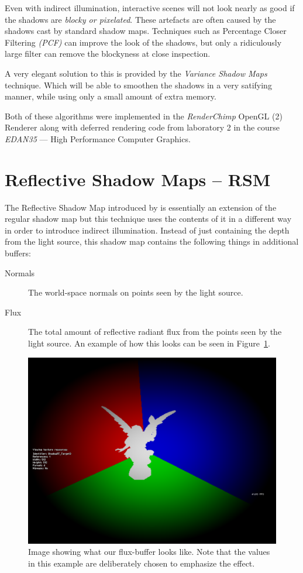 \documentclass{acmsiggraph}               %
\begin{document}
Even with indirect illumination, interactive scenes will not look nearly as good if the shadows are \emph{blocky or pixelated}. These artefacts are often caused by the shadows cast by standard shadow maps. Techniques such as Percentage Closer Filtering \emph{(PCF)} can improve the look of the shadows, but only a ridiculously large filter can remove the blockyness at close inspection.

A very elegant solution to this is provided by the \emph{Variance Shadow Maps} technique. Which will be able to smoothen the shadows in a very satifying manner, while using only a small amount of extra memory.

Both of these algorithms were implemented in the \emph{RenderChimp} OpenGL (2) Renderer along with deferred rendering code from laboratory 2 in the course \emph{EDAN35} --- High Performance Computer Graphics.

\section{Reflective Shadow Maps -- RSM}
\label{sec:rsm}
The Reflective Shadow Map introduced by \cite{RSM2005} is essentially an extension of the regular shadow map but this technique uses the contents of it in a different way in order to introduce indirect illumination. Instead of just containing the depth from the light source, this shadow map contains the following things in additional buffers:

\begin{description}
	\item[Normals] The world-space normals on points seen by the light source.
	\item[Flux] The total amount of reflective radiant flux from the points seen by the light source. An example of how this looks can be seen in Figure~\ref{fig:flux}.
\end{description}

\begin{figure}[tb]
    \centering
    \includegraphics[width=0.7\columnwidth]{./images/flux.png}
    \caption{Image showing what our flux-buffer looks like. Note that the values in this example are deliberately chosen to emphasize the effect.}
    \label{fig:flux}
\end{figure}
\end{document}
